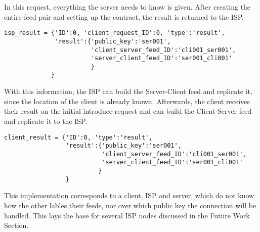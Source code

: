 In this request, everything the server needs to know is given. After creating the entire feed-pair and setting up the contract, the result is returned to the ISP.
\\
\begin{lstlisting}
isp_result = {'ID':0, 'client_request_ID':0, 'type':'result', 
              'result':{'public_key':'ser001', 
                        'client_server_feed_ID':'cli001_ser001',
                        'server_client_feed_ID':'ser001_cli001'
                        }
             }
\end{lstlisting}
With this information, the ISP can build the Server-Client feed and replicate it, since the location of the client is already known.
Afterwards, the client receives their result on the initial introduce-request and can build the Client-Server feed and replicate it to the ISP.\\
\begin{lstlisting}
client_result = {'ID':0, 'type':'result', 
                 'result':{'public_key':'ser001', 
                           'client_server_feed_ID':'cli001_ser001', 
                           'server_client_feed_ID':'ser001_cli001'
                          }
                 }
\end{lstlisting}
This implementation corresponds to a client, ISP and server, which do not know how the other lables their feeds, nor over which public key the connection will be handled. This lays the base for several ISP nodes discussed in the Future Work Section. 

